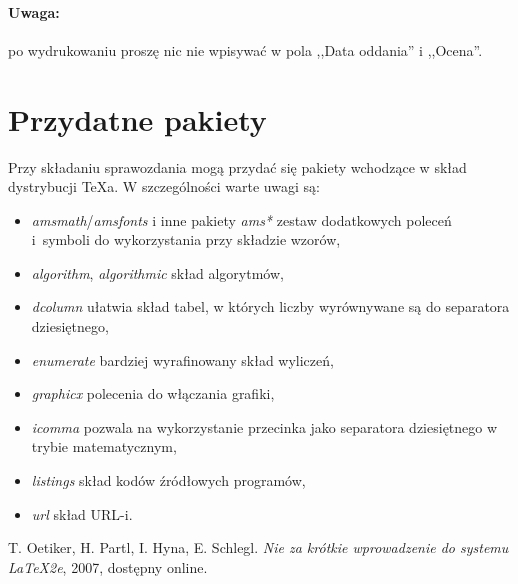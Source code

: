 \documentclass{classrep}
\begin{document}
\paragraph{Uwaga:} po wydrukowaniu proszę nic nie wpisywać w pola
,,Data oddania'' i ,,Ocena''.

\section{Przydatne pakiety}
Przy składaniu sprawozdania mogą przydać się pakiety wchodzące w
skład dystrybucji \TeX\dywiz a. W szczególności warte uwagi są:
\begin{itemize}
  \item \emph{amsmath}/\emph{amsfonts} i inne pakiety \emph{ams*} \ppauza
    zestaw dodatkowych poleceń i~symboli do wykorzystania przy składzie
    wzorów,
  \item \emph{algorithm}, \emph{algorithmic} \ppauza skład algorytmów,
  \item \emph{dcolumn} \ppauza ułatwia skład tabel, w których liczby
    wyrównywane są do separatora dziesiętnego,
  \item \emph{enumerate} \ppauza bardziej wyrafinowany skład wyliczeń,
  \item \emph{graphicx} \ppauza polecenia do włączania grafiki,
  \item \emph{icomma} \ppauza pozwala na wykorzystanie przecinka jako
    separatora dziesiętnego w trybie matematycznym,
  \item \emph{listings} \ppauza skład kodów źródłowych programów,
  \item \emph{url} \ppauza skład URL-i.
\end{itemize}



\begin{thebibliography}{0}
   T. Oetiker, H. Partl, I. Hyna, E. Schlegl.
    \textsl{Nie za krótkie wprowadzenie do systemu \LaTeX2e}, 2007, dostępny
    online.
\end{thebibliography}
\end{document}
